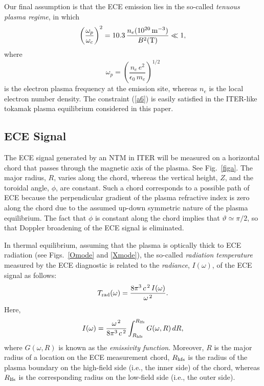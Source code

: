 \documentclass[12pt,prb,aps]{revtex4-1}
\begin{document}
Our final assumption is that the ECE emission lies in the so-called {\em tenuous plasma regime}, in which
\begin{equation}\label{a6}
\left(\frac{\omega_p}{\omega_c}\right)^2 = 10.3\,\frac{n_e(10^{20}\,{\rm m}^{-3})}{B^2({\rm T})}\ll 1,
\end{equation}
where
\begin{equation}
\omega_p = \left(\frac{n_e\,e^2}{\epsilon_0\,m_e}\right)^{1/2}
\end{equation}
is the electron plasma frequency at the emission site, whereas $n_e$ is the local electron number density. The constraint (\ref{a6}) is
easily satisfied in the ITER-like tokamak plasma equilibrium considered in this paper. 

\subsection{ECE Signal}
The ECE signal generated by an NTM in ITER will be  measured on a horizontal chord that passes through the magnetic axis of the plasma. See Fig.~\ref{figa}. 
The major radius, $R$, varies along the chord, whereas 
the vertical height, $Z$, and the toroidal angle, $\phi$, are constant. Such a chord corresponds to a possible  path of ECE because 
the perpendicular gradient of the plasma refractive index is zero along the chord due to the assumed up-down symmetric nature of the plasma equilibrium. 
The fact that $\phi$
is constant along the chord implies that $\vartheta\simeq \pi/2$, so that Doppler
broadening of the ECE signal is eliminated.\cite{ece4a,ece5} 

In thermal equilibrium, assuming that the plasma is optically thick to ECE radiation (see Figs.~\ref{Omode} and \ref{Xmode}), the so-called {\em radiation temperature}\/ measured by the ECE diagnostic is related to the {\em radiance}, $I(\omega)$, of the ECE signal as follows:\,\cite{bornatici}
\begin{equation}\label{a8}
T_{\rm rad}(\omega)=\frac{8\pi^3\,c^{\,2}\, I(\omega)}{\omega^{\,2}}.
\end{equation}
Here,
\begin{equation}\label{a9}
I(\omega) = \frac{\omega^{\,2}}{8\pi^3\,c^{\,2}}\int_{R_{\rm hfs}}^{R_{\rm lfs}}G(\omega, R)\,dR,
\end{equation}
where $G(\omega,R)$ is known as the {\em emissivity function}. Moreover, $R$ is the major radius of a location on the ECE measurement chord, $R_{\rm hfs}$ is the radius
of the plasma boundary on the high-field side (i.e., the inner side) of the chord, whereas $R_{\rm lfs}$ is the corresponding radius 
on the low-field side (i.e., the outer side).
\end{document}
